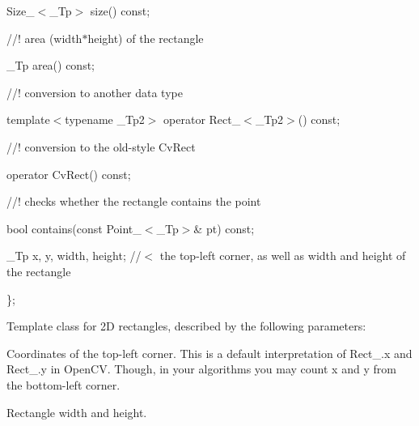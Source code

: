 {\ttfamily }

{\ttfamily }

{\ttfamily Size\+\_\+$<$\+\_\+\+Tp$>$ size() const;}

{\ttfamily }

{\ttfamily }

{\ttfamily //! area (width$\ast$height) of the rectangle}

{\ttfamily }

{\ttfamily }

{\ttfamily \+\_\+\+Tp area() const;}

{\ttfamily }

{\ttfamily }

{\ttfamily //! conversion to another data type}

{\ttfamily }

{\ttfamily }

{\ttfamily template$<$typename \+\_\+\+Tp2$>$ operator Rect\+\_\+$<$\+\_\+\+Tp2$>$() const;}

{\ttfamily }

{\ttfamily }

{\ttfamily //! conversion to the old-\/style Cv\+Rect}

{\ttfamily }

{\ttfamily }

{\ttfamily operator Cv\+Rect() const;}

{\ttfamily }

{\ttfamily }

{\ttfamily //! checks whether the rectangle contains the point}

{\ttfamily }

{\ttfamily }

{\ttfamily bool contains(const Point\+\_\+$<$\+\_\+\+Tp$>$\& pt) const;}

{\ttfamily }

{\ttfamily }

{\ttfamily \+\_\+\+Tp x, y, width, height; //$<$ the top-\/left corner, as well as width and height of the rectangle}

{\ttfamily }

{\ttfamily }

{\ttfamily \};}

{\ttfamily }

{\ttfamily }

{\ttfamily Template class for 2D rectangles, described by the following parameters\+: }


\begin{DoxyItemize}
\item Coordinates of the top-\/left corner. This is a default interpretation of {\ttfamily Rect\+\_\+.\+x} and {\ttfamily Rect\+\_\+.\+y} in Open\+CV. Though, in your algorithms you may count {\ttfamily x} and {\ttfamily y} from the bottom-\/left corner. 
\item Rectangle width and height. 
\end{DoxyItemize}

